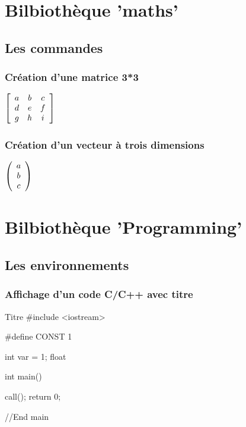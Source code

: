 


\chapter{Bilbiothèque 'maths'}


\section{Les commandes}


\subsection{Création d'une matrice 3*3}


$\left [\begin{array}{ccc} a & b & c \\ d & e & f \\ g & h & i\end{array} \right ]  $

\subsection{Création d'un vecteur à trois dimensions}
$\left (\begin{array}{ccc} a \\ b \\ c\end{array} \right )  $





\chapter{Bilbiothèque 'Programming'}


\section{Les environnements}


\subsection{Affichage d'un code C/C++ avec titre}


\begin{Cpp}{Titre}
#include <iostream>

#define CONST 1

int var = 1;
float 

int main() {
  
  call();
  return 0;

}//End main

\end{Cpp}

